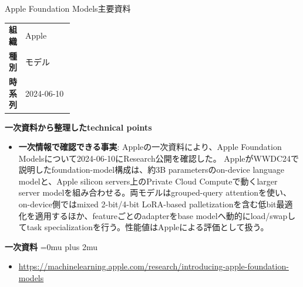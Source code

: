 \Needspace{0.38\textheight}
\begin{technicalnote}{Apple Foundation Models}{主要資料}
\begingroup
\begin{tabularx}{\linewidth}{@{}>{\bfseries}p{0.22\linewidth}X@{}}
組織 & Apple \\
種別 & モデル \\
時系列 & 2024-06-10 \\
\end{tabularx}
\smallskip
\begin{minipage}{\linewidth}
{\bfseries 一次資料から整理したtechnical points}
\begin{itemize}[leftmargin=1.5em,itemsep=0.35em]
\item \textbf{一次情報で確認できる事実}: Appleの一次資料により、Apple Foundation Modelsについて2024-06-10にResearch公開を確認した。 AppleがWWDC24で説明したfoundation-model構成は、約3B parametersのon-device language modelと、Apple silicon servers上のPrivate Cloud Computeで動くlarger server modelを組み合わせる。両モデルはgrouped-query attentionを使い、on-device側ではmixed 2-bit/4-bit LoRA-based palletizationを含む低bit最適化を適用するほか、featureごとのadapterをbase modelへ動的にload/swapしてtask specializationを行う。性能値はAppleによる評価として扱う。
\end{itemize}
\begin{minipage}{\linewidth}
\begin{samepage}
{\bfseries 一次資料}
\begingroup\sloppy
\Urlmuskip=0mu plus 2mu\relax
\begin{itemize}[leftmargin=1.5em,itemsep=0.25em]
\item {\scriptsize\url{https://machinelearning.apple.com/research/introducing-apple-foundation-models}}
\end{itemize}
\endgroup
\end{samepage}
\end{minipage}
\end{minipage}
\endgroup
\end{technicalnote}
\medskip

